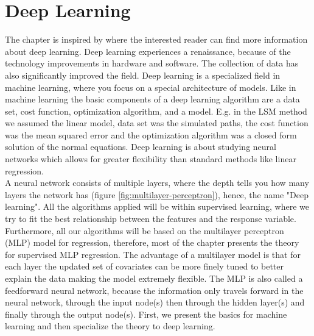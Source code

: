 
\chapter{Deep Learning} %

\label{Chapter4} %

The chapter is inspired by \parencite{Goodfellow-et-al-2016,Mackay18} where the interested reader can find more information about deep learning. Deep learning experiences a renaissance, because of the technology improvements in hardware and software. The collection of data has also significantly improved the field. Deep learning is a specialized field in machine learning, where you focus on a special architecture of models. Like in machine learning the basic components of a deep learning algorithm are a data set, cost function, optimization algorithm, and a model. E.g. in the LSM method we assumed the linear model, data set was the simulated paths, the cost function was the mean squared error and the optimization algorithm was a closed form solution of the normal equations. Deep learning is about studying neural networks which allows for greater flexibility than standard methods like linear regression. \\

A neural network consists of multiple layers, where the depth tells you how many layers the network has (figure \ref{fig:multilayer-perceptron}), hence, the name "Deep learning". All the algorithms applied will be within supervised learning, where we try to fit the best relationship between the features and the response variable. Furthermore, all our algorithms will be based on the multilayer perceptron (MLP) model for regression, therefore, most of the chapter presents the theory for supervised MLP regression. The advantage of a multilayer model is that for each layer the updated set of covariates can be more finely tuned to better explain the data making the model extremely flexible. The MLP is also called a feedforward neural network, because the information only travels forward in the neural network, through the input node(s) then through the hidden layer(s) and finally through the output node(s). First, we present the basics for machine learning and then specialize the theory to deep learning.


